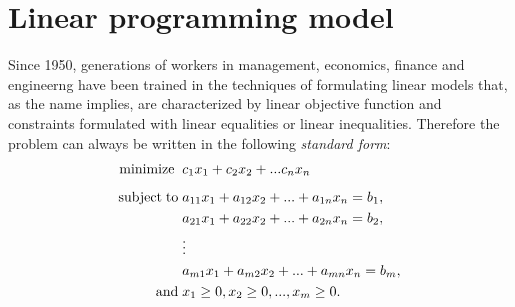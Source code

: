 \documentclass[a4paper,10 pt,titlepage,twoside]{report}
\theoremstyle{plain}
\theoremstyle{definition}
\theoremstyle{remark}
\begin{document}
\section{Linear programming model}

Since 1950, generations of workers in management, economics, finance and engineerng have been trained in the techniques of formulating linear models that,
as the name implies, are characterized by linear objective function and constraints formulated with linear equalities or linear inequalities. Therefore the problem can always be written
in the following \textit{standard form}:
\begin{alignat*}{1}\label{eq:stdform}
\text{minimize\;}\; &c_1 x_1 + c_2 x_2+ ... c_n x_n\\[1.8mm]
\text{subject\;to\;} &a_{11} x_1 + a_{12} x_2+ ... +a_{1n}x_n = b_1,\\
&a_{21} x_1 + a_{22} x_2 + ... + a_{2n} x_n= b_2,\\
&\vdots\\
&a_{m1} x_1 + a_{m2} x_2 + ... + a_{mn} x_n= b_m,\\
\text{and}\; & x_1 \geq 0 , x_2 \geq 0, ... , x_m \geq 0.
 \end{alignat*}
\end{document}
